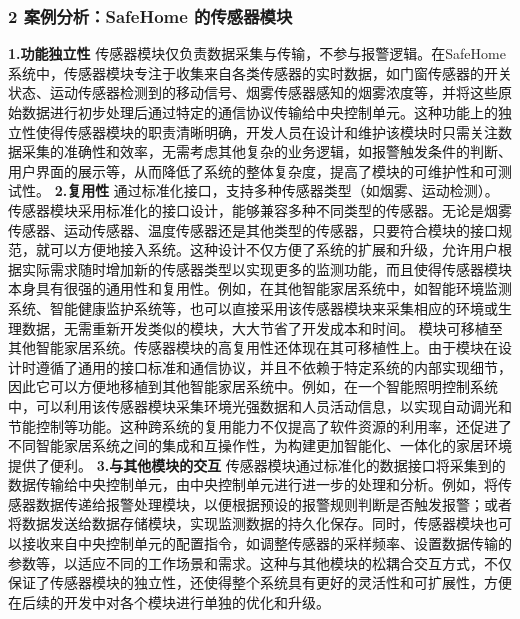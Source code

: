 \subsubsection{2 案例分析：SafeHome 的传感器模块}\label{ux6848ux4f8bux5206ux6790safehome-ux7684ux4f20ux611fux5668ux6a21ux5757}
\textbf{1.功能独立性}
传感器模块仅负责数据采集与传输，不参与报警逻辑。在SafeHome系统中，传感器模块专注于收集来自各类传感器的实时数据，如门窗传感器的开关状态、运动传感器检测到的移动信号、烟雾传感器感知的烟雾浓度等，并将这些原始数据进行初步处理后通过特定的通信协议传输给中央控制单元。这种功能上的独立性使得传感器模块的职责清晰明确，开发人员在设计和维护该模块时只需关注数据采集的准确性和效率，无需考虑其他复杂的业务逻辑，如报警触发条件的判断、用户界面的展示等，从而降低了系统的整体复杂度，提高了模块的可维护性和可测试性。
\textbf{2.复用性}
通过标准化接口，支持多种传感器类型（如烟雾、运动检测）。传感器模块采用标准化的接口设计，能够兼容多种不同类型的传感器。无论是烟雾传感器、运动传感器、温度传感器还是其他类型的传感器，只要符合模块的接口规范，就可以方便地接入系统。这种设计不仅方便了系统的扩展和升级，允许用户根据实际需求随时增加新的传感器类型以实现更多的监测功能，而且使得传感器模块本身具有很强的通用性和复用性。例如，在其他智能家居系统中，如智能环境监测系统、智能健康监护系统等，也可以直接采用该传感器模块来采集相应的环境或生理数据，无需重新开发类似的模块，大大节省了开发成本和时间。
模块可移植至其他智能家居系统。传感器模块的高复用性还体现在其可移植性上。由于模块在设计时遵循了通用的接口标准和通信协议，并且不依赖于特定系统的内部实现细节，因此它可以方便地移植到其他智能家居系统中。例如，在一个智能照明控制系统中，可以利用该传感器模块采集环境光强数据和人员活动信息，以实现自动调光和节能控制等功能。这种跨系统的复用能力不仅提高了软件资源的利用率，还促进了不同智能家居系统之间的集成和互操作性，为构建更加智能化、一体化的家居环境提供了便利。
\textbf{3.与其他模块的交互}
传感器模块通过标准化的数据接口将采集到的数据传输给中央控制单元，由中央控制单元进行进一步的处理和分析。例如，将传感器数据传递给报警处理模块，以便根据预设的报警规则判断是否触发报警；或者将数据发送给数据存储模块，实现监测数据的持久化保存。同时，传感器模块也可以接收来自中央控制单元的配置指令，如调整传感器的采样频率、设置数据传输的参数等，以适应不同的工作场景和需求。这种与其他模块的松耦合交互方式，不仅保证了传感器模块的独立性，还使得整个系统具有更好的灵活性和可扩展性，方便在后续的开发中对各个模块进行单独的优化和升级。
